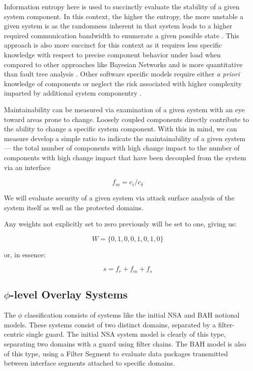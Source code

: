 Information entropy here is used to succinctly evaluate the stability of a given system component.  In this context, the higher the entropy, the more unstable a given system is as the randomness inherent in that system leads to a higher required communication bandwidth to enumerate a given possible state \cite{cover:book91}.  This approach is also more succinct for this context as it requires less specific knowledge with respect to precise component behavior under load when compared to other approaches like Bayesian Networks and is more quantitative than fault tree analysis \cite{Rausand-Hoyland-2003}.  Other software specific models require either \textit{a priori} knowledge of components or neglect the risk associated with higher complexity imparted by additional system componentry \cite{5305674,5368230}.  

Maintainability can be measured via examination of a given system with an eye toward areas prone to change.  Loosely coupled components directly contribute to the ability to change a specific system component.  With this in mind, we can measure develop a simple ratio to indicate the maintainability of a given system --- the total number of components with high change impact to the number of components with high change impact that have been decoupled from the system via an interface 

\begin{equation}
f_{m} = c_{i} / c_{\delta}
\end{equation}

We will evaluate security of a given system via attack surface analysis of the system itself as well as the protected domains.

Any weights not explicitly set to zero previously will be set to one, giving us:

\begin{equation}
W = \lbrace 0, 1, 0, 0, 1, 0, 1, 0 \rbrace
\end{equation}

or, in essence:

\label{equation:final}
\begin{equation}
s = f_{r} + f_{m} + f_{s}
\end{equation}

\subsection{$\phi$-level Overlay Systems}
The $\phi$ classification consists of systems like the initial NSA and BAH notional models.  These systems consist of two distinct domains, separated by a filter-centric single guard.  The initial NSA system model is clearly of this type, separating two domains with a guard using filter chains.  The BAH model is also of this type, using a Filter Segment to evaluate data packages transmitted between interface segments attached to specific domains.

